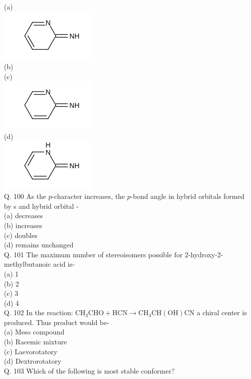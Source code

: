 \documentclass[10pt]{article}
\begin{document}
(a)\\
\includegraphics{smile-8d17e79b7b4d4c745aecf51eac95da0687525455}\\
(b)\\
(c)\\
\includegraphics{smile-53fcab7fcbcd180eb0cdfad2015973c76a5c138f}\\
(d)\\
\includegraphics{smile-ef2aeef66b611eb617e13a3d52d514d4f049804f}\\
Q. 100 As the $p$-character increases, the $p$-bond angle in hybrid orbitals formed by s and hybrid orbital -\\
(a) decreases\\
(b) increases\\
(c) doubles\\
(d) remains unchanged\\
Q. 101 The maximum number of stereoisomers possible for 2-hydroxy-2-methylbutanoic acid is-\\
(a) 1\\
(b) 2\\
(c) 3\\
(d) 4\\
Q. 102 In the reaction: $\mathrm{CH}_{3} \mathrm{CHO}+\mathrm{HCN} \rightarrow \mathrm{CH}_{3} \mathrm{CH}(\mathrm{OH}) \mathrm{CN}$ a chiral center is produced. Thus product would be-\\
(a) Meso compound\\
(b) Racemic mixture\\
(c) Laevorotatory\\
(d) Dextrorotatory\\
Q. 103 Which of the following is most stable conformer?\\
\end{document}
